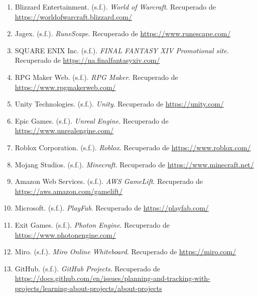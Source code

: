 \begin{enumerate} 
  \item Blizzard Entertainment. (s.f.). \textit{World of Warcraft}. Recuperado de \url{https://worldofwarcraft.blizzard.com/}
  \item Jagex. (s.f.). \textit{RuneScape}. Recuperado de \url{https://www.runescape.com/}
  \item SQUARE ENIX Inc. (s.f.). \textit{FINAL FANTASY XIV Promotional site}. Recuperado de \url{https://na.finalfantasyxiv.com/}
  \item RPG Maker Web. (s.f.). \textit{RPG Maker}. Recuperado de \url{https://www.rpgmakerweb.com/}
  \item Unity Technologies. (s.f.). \textit{Unity}. Recuperado de \url{https://unity.com/}
  \item Epic Games. (s.f.). \textit{Unreal Engine}. Recuperado de \url{https://www.unrealengine.com/}
  \item Roblox Corporation. (s.f.). \textit{Roblox}. Recuperado de \url{https://www.roblox.com/}
  \item Mojang Studios. (s.f.). \textit{Minecraft}. Recuperado de \url{https://www.minecraft.net/}
  \item Amazon Web Services. (s.f.). \textit{AWS GameLift}. Recuperado de \url{https://aws.amazon.com/gamelift/}
  \item Microsoft. (s.f.). \textit{PlayFab}. Recuperado de \url{https://playfab.com/}
  \item Exit Games. (s.f.). \textit{Photon Engine}. Recuperado de \url{https://www.photonengine.com/}
  \item Miro. (s.f.). \textit{Miro Online Whiteboard}. Recuperado de \url{https://miro.com/}
  \item GitHub. (s.f.). \textit{GitHub Projects}. Recuperado de \url{https://docs.github.com/en/issues/planning-and-tracking-with-projects/learning-about-projects/about-projects}
\end{enumerate} 
